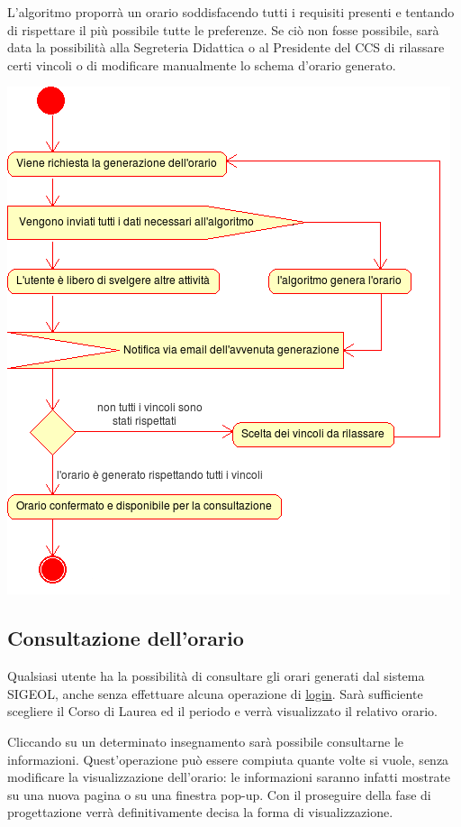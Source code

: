 \documentclass[11pt,a4paper]{article}
\begin{document}
L'algoritmo proporrà un orario soddisfacendo tutti i requisiti presenti e tentando di rispettare il più possibile tutte le preferenze. Se ciò non fosse possibile, sarà data la possibilità alla Segreteria Didattica o al Presidente del CCS di rilassare certi vincoli o di modificare manualmente lo schema d'orario generato.
\begin{center}
 \includegraphics[scale=0.85]{images/generazione_orario.png}
\end{center}

\newpage
\subsection{Consultazione dell'orario}
Qualsiasi utente ha la possibilità di consultare gli orari generati dal sistema SIGEOL, anche senza effettuare alcuna operazione di \underline{login}. Sarà sufficiente scegliere il Corso di Laurea ed il periodo e verrà visualizzato il relativo orario.

Cliccando su un determinato insegnamento sarà possibile consultarne le informazioni.
Quest'operazione può essere compiuta quante volte si vuole, senza modificare la visualizzazione dell'orario: le informazioni saranno infatti mostrate su una nuova pagina o su una finestra pop-up. Con il proseguire della fase di progettazione verrà definitivamente decisa la forma di visualizzazione.
\end{document}
